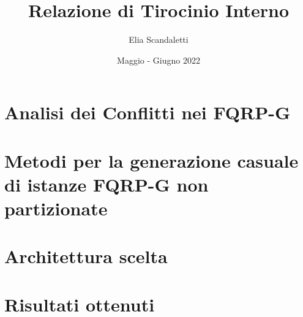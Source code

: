 

\title{Relazione di Tirocinio Interno}
\author{Elia Scandaletti}
\date{Maggio - Giugno 2022}



\maketitle
\tableofcontents

\section{Analisi dei Conflitti nei FQRP-G}


\section{Metodi per la generazione casuale di istanze FQRP-G non partizionate}


\section{Architettura scelta}


\section{Risultati ottenuti}


